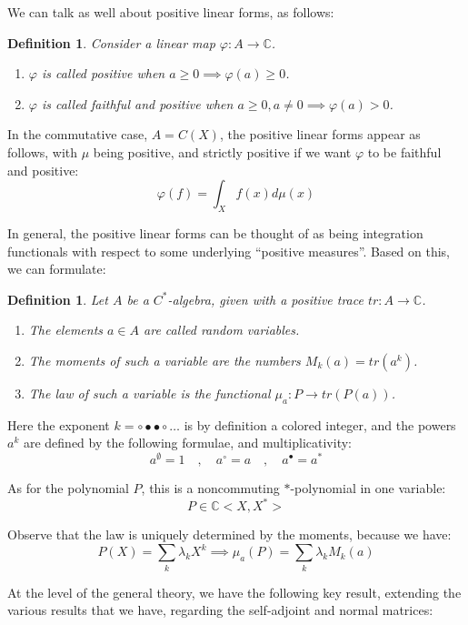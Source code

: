\documentclass[12pt]{amsbook}
\newtheorem{definition}[theorem]{Definition}
\begin{document}
We can talk as well about positive linear forms, as follows:

\begin{definition}
Consider a linear map $\varphi:A\to\mathbb C$.
\begin{enumerate}
\item $\varphi$ is called positive when $a\geq0\implies\varphi(a)\geq0$.

\item $\varphi$ is called faithful and positive when $a\geq0,a\neq0\implies\varphi(a)>0$.
\end{enumerate}
\end{definition}

In the commutative case, $A=C(X)$, the positive linear forms appear as follows, with $\mu$ being positive, and strictly positive if we want $\varphi$ to be faithful and positive:
$$\varphi(f)=\int_Xf(x)d\mu(x)$$

In general, the positive linear forms can be thought of as being integration functionals with respect to some underlying ``positive measures''. Based on this, we can formulate:

\begin{definition}
Let $A$ be a $C^*$-algebra, given with a positive trace $tr:A\to\mathbb C$.
\begin{enumerate}
\item The elements $a\in A$ are called random variables.

\item The moments of such a variable are the numbers $M_k(a)=tr(a^k)$.

\item The law of such a variable is the functional $\mu_a:P\to tr(P(a))$.
\end{enumerate}
\end{definition}

Here the exponent $k=\circ\bullet\bullet\circ\ldots$ is by definition a colored integer, and the powers $a^k$ are defined by the following formulae, and multiplicativity: 
$$a^\emptyset=1\quad,\quad
a^\circ=a\quad,\quad
a^\bullet=a^*$$ 

As for the polynomial $P$, this is a noncommuting $*$-polynomial in one variable: 
$$P\in\mathbb C<X,X^*>$$

Observe that the law is uniquely determined by the moments, because we have:
$$P(X)=\sum_k\lambda_kX^k
\implies\mu_a(P)=\sum_k\lambda_kM_k(a)$$

At the level of the general theory, we have the following key result, extending the various results that we have, regarding the self-adjoint and normal matrices:
\end{document}
